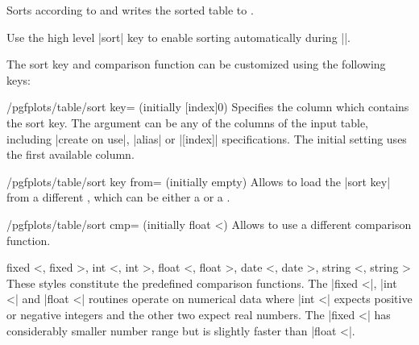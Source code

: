 \begin{command}{\pgfplotstablesort{}}
	Sorts  according to  and writes the sorted table to .

	Use the high level |sort| key to enable sorting automatically during |\pgfplotstabletypeset|.

\begin{codeexample}[]
\pgfplotstablesort{}
\pgfplotstabletypeset[columns/c/.style={string type}]{\result}%
\end{codeexample}
	
	The sort key and comparison function can be customized using the following keys:
	\begin{key}{/pgfplots/table/sort key= (initially [index]0)}
		Specifies the column which contains the sort key. The argument  can be any of the columns of the input table, including |create on use|, |alias| or |[index]| specifications. The initial setting uses the first available column.
	\end{key}
	\begin{key}{/pgfplots/table/sort key from= (initially empty)}
		Allows to load the |sort key| from a different , which can be either a  or a .
	\end{key}

	\begin{key}{/pgfplots/table/sort cmp= (initially float <)}
		Allows to use a different comparison function.
		\begin{pgfplotskeylist}{%
			fixed <,
			fixed >,
			int <,
			int >,
			float <,
			float >,
			date <,
			date >,
			string <,
			string >}
			These styles constitute the predefined comparison functions. The |fixed <|, |int <| and |float <| routines operate on numerical data where |int <| expects positive or negative integers and the other two expect real numbers. The |fixed <| has considerably smaller number range but is slightly faster than |float <|.


\end{pgfplotskeylist}
\end{key}
\end{command}

